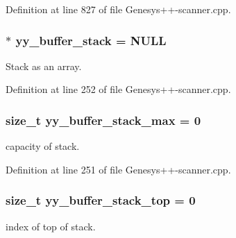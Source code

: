 Definition at line 827 of file Genesys++-\/scanner.\-cpp.

\hypertarget{_genesys_09_09-scanner_8cpp_a34b6ab3a3061471b6604dba48e47a101}{
\subsubsection[{yy\-\_\-buffer\-\_\-stack}]{$\ast$ yy\-\_\-buffer\-\_\-stack = N\-U\-L\-L\hspace{0.3cm}{\ttfamily [static]}}}\label{_genesys_09_09-scanner_8cpp_a34b6ab3a3061471b6604dba48e47a101}
Stack as an array. 

Definition at line 252 of file Genesys++-\/scanner.\-cpp.

\hypertarget{_genesys_09_09-scanner_8cpp_a437cdcd878686881404e320fd941929c}{
\subsubsection[{yy\-\_\-buffer\-\_\-stack\-\_\-max}]{\setlength{\rightskip}{0pt plus 5cm}size\-\_\-t yy\-\_\-buffer\-\_\-stack\-\_\-max = 0\hspace{0.3cm}{\ttfamily [static]}}}\label{_genesys_09_09-scanner_8cpp_a437cdcd878686881404e320fd941929c}
capacity of stack. 

Definition at line 251 of file Genesys++-\/scanner.\-cpp.

\hypertarget{_genesys_09_09-scanner_8cpp_ae54779a12769204c826899d0531e40e6}{
\subsubsection[{yy\-\_\-buffer\-\_\-stack\-\_\-top}]{\setlength{\rightskip}{0pt plus 5cm}size\-\_\-t yy\-\_\-buffer\-\_\-stack\-\_\-top = 0\hspace{0.3cm}{\ttfamily [static]}}}\label{_genesys_09_09-scanner_8cpp_ae54779a12769204c826899d0531e40e6}
index of top of stack. 

